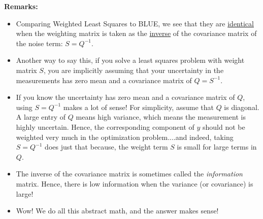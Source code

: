 \documentclass[letterpaper]{article}
\begin{document}
    \newpage

    \noindent \textbf{Remarks:}
    \begin{itemize}
    \item Comparing Weighted Least Squares to BLUE, we see that they are \underline{identical} when the weighting matrix is taken as the \underline{inverse} of the covariance matrix of the noise term: $S=Q^{-1}$.

        \item Another way to say this, if you solve a least squares problem with weight matrix $S$, you are implicitly assuming that your uncertainty in the measurements has zero mean and a covariance matrix of $Q=S^{-1}$.

            \item If you know the uncertainty has zero mean and a covariance matrix of $Q$, using $S=Q^{-1}$ makes a lot of sense! For simplicity, assume that $Q$ is diagonal. A large entry of $Q$ means high variance, which means the measurement is highly uncertain. Hence, the corresponding component of $y$ should not be weighted very much in the optimization problem....and indeed, taking $S=Q^{-1}$ does just that because, the weight term $S$ is small for large terms in $Q$.

                \item The inverse of the covariance matrix is sometimes called the \textit{information} matrix. Hence, there is low information when the variance (or covariance) is large!

                    \item Wow! We do all this abstract math, and the answer makes sense!

    \end{itemize}
\end{document}
